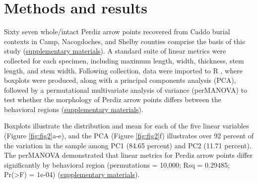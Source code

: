 \documentclass[smallextended]{svjour3}       %
\begin{document}
\hypertarget{methods-and-results}{%
\section{Methods and results}\label{methods-and-results}}

Sixty seven whole/intact Perdiz arrow points recovered from Caddo burial
contexts in Camp, Nacogdoches, and Shelby counties comprise the basis of
this study (\href{https://seldenlab.github.io/perdiz3/}{supplementary
materials}). A standard suite of linear metrics were collected for each
specimen, including maximum length, width, thickness, stem length, and
stem width. Following collection, data were imported to R \cite{RN8584},
where boxplots were produced, along with a principal components analysis
(PCA), followed by a permutational multivariate analysis of variance
(perMANOVA) to test whether the morphology of Perdiz arrow points
differs between the behavioral regions
(\href{https://seldenlab.github.io/perdiz3/}{supplementary materials}).

Boxplots illustrate the distribution and mean for each of the five
linear variables (Figure \ref{fig:fig2}a-e), and the PCA (Figure
\ref{fig:fig2}f) illustrates over 92 percent of the variation in the
sample among PC1 (84.65 percent) and PC2 (11.71 percent). The perMANOVA
demonstrated that linear metrics for Perdiz arrow points differ
significantly by behavioral region (permutations = 10,000; Rsq =
0.29485; Pr(\textgreater F) = 1e-04)
(\href{https://seldenlab.github.io/perdiz3/}{supplementary materials}).
\end{document}

